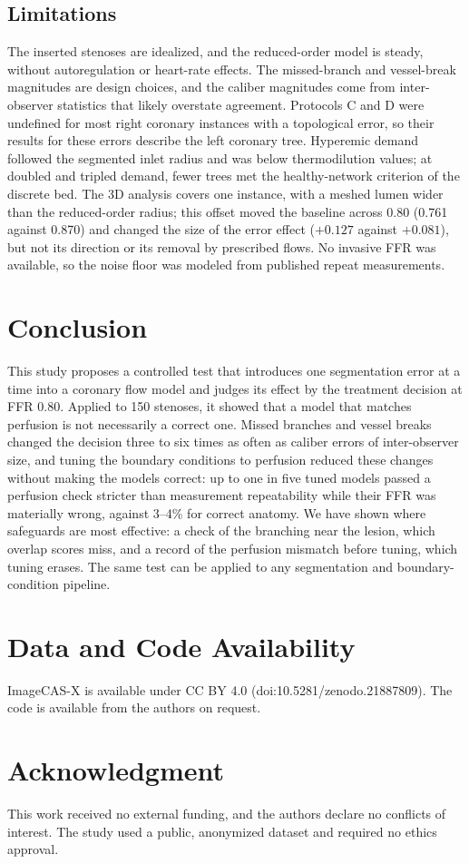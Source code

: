 \documentclass[journal]{IEEEtran}
\begin{document}
\subsection{Limitations}
The inserted stenoses are idealized, and the reduced-order model is steady, without autoregulation or heart-rate
effects. The missed-branch and vessel-break magnitudes are design choices, and the caliber magnitudes come from
inter-observer statistics that likely overstate agreement. Protocols C and D were undefined for most right coronary
instances with a topological error, so their results for these errors describe the left coronary tree. Hyperemic
demand followed the segmented inlet radius and was below thermodilution values; at doubled and tripled demand,
fewer trees met the healthy-network criterion of the discrete bed. The 3D analysis covers one instance, with a
meshed lumen wider than the reduced-order radius; this offset moved the baseline
across 0.80 (0.761 against 0.870) and changed the size of the error effect ($+0.127$ against $+0.081$), but not its
direction or its removal by prescribed flows. No invasive FFR was available, so the noise floor was modeled from published repeat
measurements.

\section{Conclusion}
This study proposes a controlled test that introduces one segmentation error at a time into a coronary flow model and judges
its effect by the treatment decision at FFR 0.80. Applied to 150 stenoses, it showed that a model that matches
perfusion is not necessarily a correct one. Missed branches and vessel breaks changed the decision three to six times
as often as caliber errors of inter-observer size, and tuning the boundary conditions to perfusion reduced these
changes without making the models correct: up to one in five tuned models passed a perfusion check stricter than
measurement repeatability while their FFR was materially wrong, against 3--4\% for correct anatomy. We have
shown where safeguards are most effective: a check of the branching near the lesion, which overlap scores miss, and
a record of the perfusion mismatch before tuning, which tuning erases. The same test can be applied to any
segmentation and boundary-condition pipeline.

\section*{Data and Code Availability}
ImageCAS-X is available under CC BY 4.0 (doi:10.5281/zenodo.21887809). The code is available from the authors on request.

\section*{Acknowledgment}
This work received no external funding, and the authors declare no conflicts of interest. The study used a public, anonymized dataset and required no ethics
approval.



\end{document}
